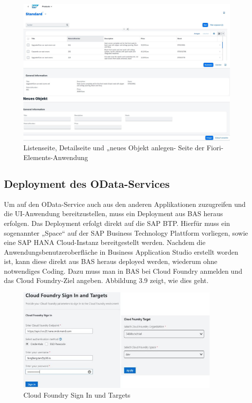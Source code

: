 \begin{figure}[htbp]
 \centering
 \includegraphics[width=1.0\textwidth]{Bilder/fiori_element/3_8_Fiori_Element_list.jpg}
 \caption{Listenseite, Detailseite und „neues Objekt anlegen- Seite der Fiori-Elements-Anwendung}
\end{figure}

\subsection{Deployment des OData-Services}

Um auf den OData-Service auch aus den anderen Applikationen zuzugreifen und die UI-Anwendung bereitzustellen, muss ein Deployment aus BAS heraus erfolgen. Das Deployment erfolgt direkt auf die SAP BTP. Hierfür muss ein sogenannter „Space“ auf der SAP Business Technology Plattform vorliegen, sowie eine SAP HANA Cloud-Instanz bereitgestellt werden. Nachdem die Anwendungsbenutzeroberfläche in Business Application Studio erstellt worden ist, kann diese direkt aus BAS heraus deployed werden, wiederum ohne notwendiges Coding. Dazu muss man in BAS bei Cloud Foundry anmelden und das Cloud Foundry-Ziel angeben. Abbildung 3.9 zeigt, wie dies geht. 

\begin{figure}[htbp]
 \centering
 \includegraphics[width=0.9\textwidth]{Bilder/fiori_element/3_9_cloud_foundry_targets.jpg}
 \caption{Cloud Foundry Sign In und Targets}
\end{figure}

